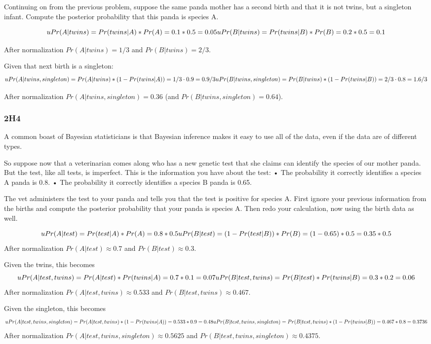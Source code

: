 \documentclass[
]{book}
\begin{document}
Continuing on from the previous problem, suppose the same panda mother has a second birth and that it is not twins, but a singleton infant. Compute the posterior probability that this panda is species A.

\[uPr(A | twins) = Pr(twins | A) * Pr(A) = 0.1 * 0.5 = 0.05 \\
uPr(B | twins) = Pr(twins | B) * Pr(B) = 0.2 * 0.5 = 0.1\]

After normalization \(Pr(A | twins) = 1/3\) and \(Pr(B | twins) = 2/3\).

Given that next birth is a singleton:
\[uPr(A | twins, singleton) = Pr(A | twins) * (1 - Pr(twins|A)) = 1/3 \cdot 0.9 = 0.9/3\\
uPr(B | twins, singleton) = Pr(B | twins) * (1 - Pr(twins|B)) = 2/3 \cdot 0.8 = 1.6/3\]

After normalization \(Pr(A | twins, singleton) = 0.36\) (and \(Pr(B | twins, singleton) = 0.64\)).

\hypertarget{h4}{%
\subsubsection*{2H4}\label{h4}}

A common boast of Bayesian statisticians is that Bayesian inference makes it easy to use all of the data, even if the data are of different types.

So suppose now that a veterinarian comes along who has a new genetic test that she claims can identify the species of our mother panda. But the test, like all tests, is imperfect. This is the information you have about the test:
• The probability it correctly identifies a species A panda is 0.8.
• The probability it correctly identifies a species B panda is 0.65.

The vet administers the test to your panda and tells you that the test is positive for species A. First ignore your previous information from the births and compute the posterior probability that your panda is species A. Then redo your calculation, now using the birth data as well.

\[uPr(A | test) = Pr(test | A) * Pr (A) = 0.8 * 0.5\\
uPr(B | test) = (1 - Pr(test | B)) * Pr (B) = (1 - 0.65) * 0.5 = 0.35 * 0.5\]
After normalization \(Pr(A | test) \approx 0.7\) and \(Pr(B | test) \approx 0.3\).

Given the twins, this becomes
\[uPr(A | test, twins) = Pr(A | test) * Pr(twins | A) = 0.7 * 0.1 = 0.07\\
uPr(B | test, twins) = Pr(B | test) * Pr(twins | B) = 0.3 * 0.2 = 0.06\]
After normalization \(Pr(A | test, twins) \approx 0.533\) and \(Pr(B | test, twins) \approx 0.467\).

Given the singleton, this becomes
\[uPr(A | test, twins, singleton) = Pr(A | test, twins) * (1 - Pr(twins | A)) = 0.533 * 0.9 = 0.48\\
uPr(B | test, twins, singleton) = Pr(B | test, twins) * (1 - Pr(twins | B)) = 0.467 * 0.8 = 0.3736\]
After normalization \(Pr(A | test, twins, singleton) \approx 0.5625\) and \(Pr(B | test, twins, singleton) \approx 0.4375\).

  
\end{document}
